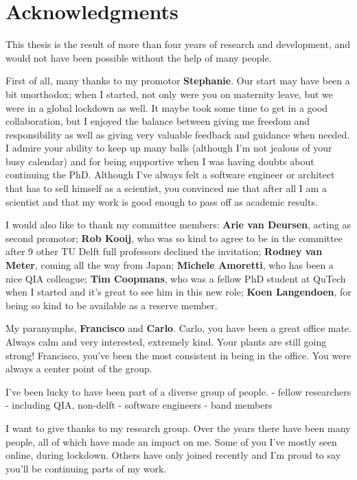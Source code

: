 \chapter*{Acknowledgments}


This thesis is the result of more than four years of research and development, and would not have been possible without the help of many people.

First of all, many thanks to my promotor \textbf{Stephanie}.
Our start may have been a bit unorthodox; when I started, not only were you on maternity leave, but we were in a global lockdown as well.
It maybe took some time to get in a good collaboration, but I enjoyed the balance between giving me freedom and responsibility as well as giving very valuable feedback and guidance when needed.
I admire your ability to keep up many balls (although I'm not jealous of your busy calendar) and for being supportive when I was having doubts about continuing the PhD.
Although I've always felt a software engineer or architect that has to sell himself as a scientist, you convinced me that after all I am a scientist and that my work is good enough to pass off as academic results.

I would also like to thank my committee members:
\textbf{Arie van Deursen}, acting as second promotor;
\textbf{Rob Kooij}, who was so kind to agree to be in the committee after 9 other TU Delft full professors declined the invitation;
\textbf{Rodney van Meter}, coming all the way from Japan;
\textbf{Michele Amoretti}, who has been a nice QIA colleague;
\textbf{Tim Coopmans}, who was a fellow PhD student at QuTech when I started and it's great to see him in this new role;
\textbf{Koen Langendoen}, for being so kind to be available as a reserve member.

My paranymphs, \textbf{Francisco} and \textbf{Carlo}.
Carlo, you have been a great office mate. Always calm and very interested, extremely kind. Your plants are still going strong!
Francisco, you've been the most consistent in being in the office. You were always a center point of the group.


I've been lucky to have been part of a diverse group of people.
- fellow researchers
    - including QIA, non-delft
- software engineers
- band members


I want to give thanks to my research group.
Over the years there have been many people, all of which have made an impact on me.
Some of you I've mostly seen online, during lockdown.
Others have only joined recently and I'm proud to say you'll be continuing parts of my work.


